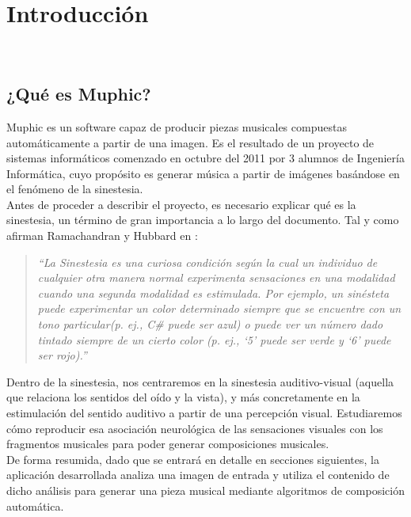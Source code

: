 \chapter{Introducción}
\label{chap:intro}

\\

	\section{¿Qué es Muphic?}
	\label{sec:quees}
	
		\vspace{0.2in}
		Muphic es un software capaz de producir piezas musicales compuestas automáticamente a partir de una imagen. Es el resultado de un proyecto de sistemas informáticos comenzado en octubre del 2011 por 3 alumnos de Ingeniería Informática, cuyo propósito es generar música a partir de imágenes basándose en el fenómeno de la sinestesia.\\
		
		Antes de proceder a describir el proyecto, es necesario explicar qué es la sinestesia, un término de gran importancia a lo largo del documento. Tal y como afirman Ramachandran y Hubbard en \cite[pg.~4]{paperSyn}:
		
		\begin{quote}
		\emph{``La Sinestesia es una curiosa condición según la cual un individuo de cualquier otra manera normal experimenta sensaciones en una modalidad cuando una segunda modalidad es estimulada. Por ejemplo, un sinésteta puede experimentar un color determinado siempre que se encuentre con un tono particular(p. ej., C\# puede ser azul) o puede ver un número dado tintado siempre de un cierto color (p. ej., ‘5’ puede ser verde y ‘6’ puede ser rojo).''}
		\end{quote}
		
		Dentro de la sinestesia, nos centraremos en la sinestesia auditivo-visual (aquella que relaciona los sentidos del oído y la vista), y más concretamente en la estimulación del sentido auditivo a partir de una percepción visual. Estudiaremos cómo reproducir esa asociación neurológica de las sensaciones visuales con los fragmentos musicales para poder generar composiciones musicales.\\
		 
		
		De forma resumida, dado que se entrará en detalle en secciones siguientes, la aplicación desarrollada analiza una imagen de entrada y utiliza el contenido de dicho análisis para generar una pieza musical mediante algoritmos de composición automática.\\

